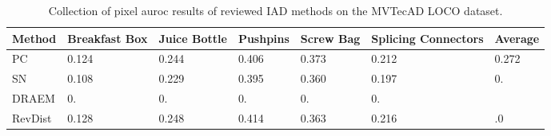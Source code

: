 \begin{table}[htbp]
    \tiny
    \centering
    \begin{tabularx}{\textwidth}{|X|X|X|X|X|X|X|}%
        \hline
        \textbf{Method} & \textbf{Breakfast Box} & \textbf{Juice Bottle} & \textbf{Pushpins} & \textbf{Screw Bag} & \textbf{Splicing Connectors} & \textbf{Average} \\
        \hline
        PC \cite{patchCore2022} & 0.124 & 0.244 & 0.406 & 0.373 & 0.212 & 0.272 \\
        \hline 
        SN \cite{liu2023simplenet} & 0.108 & 0.229 & 0.395 & 0.360 & 0.197 & 0. \\
        \hline
        DRAEM \cite{Zavrtanik_2021DRAEM} & 0. & 0. & 0. & 0. & 0. &  \\
        \hline
        RevDist \cite{revdist2023} & 0.128 & 0.248 & 0.414 & 0.363 & 0.216 & .0 \\
        \hline
    \end{tabularx}
    \caption{Collection of pixel auroc results of reviewed IAD methods on the MVTecAD LOCO \cite{LOCODentsAndScratchesBergmann2022} dataset.}
    \label{tab:sproloco}
\end{table}



